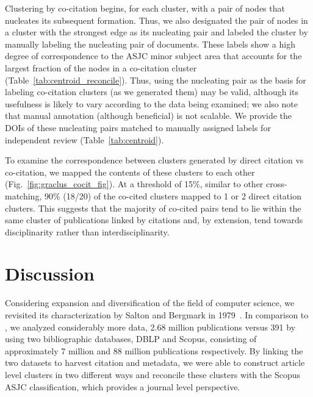 Clustering by co-citation begins, for each cluster, with a pair of nodes that nucleates its subsequent formation. Thus, we also designated the pair of nodes in a cluster with the strongest edge as its nucleating pair and labeled the cluster by manually labeling the nucleating pair of documents.  
These labels show a high degree of correspondence  to the ASJC minor subject area that accounts for the largest fraction of the nodes in a co-citation cluster (Table~\ref{tab:centroid_reconcile}). 
Thus, using the nucleating pair as the basis for labeling co-citation clusters (as we generated them) may be valid, although its usefulness is likely to vary according to the data being examined; we also note that manual annotation (although beneficial) is not scalable. We provide the DOIs of these nucleating pairs matched to manually assigned labels for independent review (Table~\ref{tab:centroid}).

To examine the correspondence between clusters generated by direct citation vs co-citation, we mapped the contents of these clusters to each other (Fig.~\ref{fig:graclus_cocit_fig}).
 At a threshold of 15\%, similar to other cross-matching, 90\% (18/20) of the co-cited clusters mapped to 1 or 2 direct citation clusters. This suggests that the majority of co-cited pairs tend to lie within the same cluster of publications linked by citations and,  by extension, tend towards disciplinarity rather than interdisciplinarity.

\section{Discussion} 
Considering expansion and diversification of the field of computer science, we revisited its characterization by Salton and Bergmark in 1979~\cite{salton_citation_1979}. In comparison to \cite{salton_citation_1979}, we analyzed considerably more data, 2.68 million publications versus 391 by using two bibliographic databases, DBLP and Scopus, consisting of  approximately 7 million and 88 million publications respectively. By linking the two datasets to harvest citation and metadata, we were able to construct article level clusters in two different ways and reconcile these clusters with the Scopus ASJC classification, which provides a journal level perspective.

